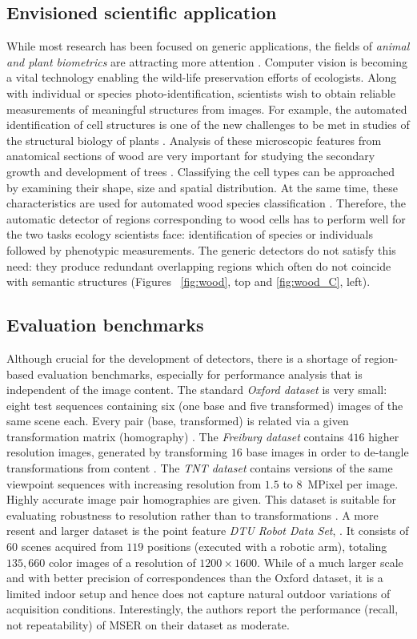 \documentclass[conference,compsoc]{IEEEtran}
\begin{document}
\subsection{Envisioned scientific application}
While most research has been focused on generic applications, the
 fields of {\em animal and plant biometrics} are attracting more attention \cite{Kuehl2013, leafsnap_eccv2012}. Computer vision is becoming a vital technology enabling the wild-life preservation efforts of ecologists. Along with individual or species photo-identification, scientists wish to obtain reliable measurements of meaningful structures from images. For example, the automated identification of cell structures is one of the new challenges to be met in studies of the structural biology of plants \cite{Quelhas2011}. Analysis of these microscopic features from anatomical sections of wood are very important for studying the secondary growth and development of trees \cite{Brunel2014}. Classifying the cell types can be approached by examining their shape, size and spatial distribution. At the same time, these characteristics are used for automated wood species classification \cite{Gasson2011}. Therefore, the  automatic detector of regions corresponding to wood cells has to perform well for the two tasks ecology scientists face: identification of species or individuals followed by phenotypic measurements. The generic detectors do not satisfy this need: they produce redundant overlapping regions which often do not coincide with semantic structures (Figures ~\ref{fig:wood}, top and \ref{fig:wood_C}, left).

\subsection{Evaluation benchmarks}
Although crucial for the development of detectors, there is a shortage of region-based evaluation benchmarks, especially for performance analysis that is independent of the image content.  The standard {\em Oxford dataset} is very small: eight test sequences containing six (one base and five transformed) images of the same scene each. Every pair (base, transformed) is related via a given transformation matrix (homography) \cite{Mikolajczyk:2005}.  The {\em Freiburg dataset} contains $416$ higher resolution images, generated by transforming $16$ base images in order to de-tangle transformations from content \cite{FischerDB14}.  
The {\em TNT dataset} contains versions of the same viewpoint sequences with increasing resolution from $1.5$ to $8$~MPixel per image. Highly accurate image pair homographies are given. This dataset is suitable for evaluating robustness to resolution rather than to transformations \cite{CorRos2013}.  A more resent and larger dataset is the point feature {\em DTU Robot Data Set}, \cite{AanaesDP12}. It  consists of $60$ scenes acquired from $119$ positions (executed with a robotic arm), totaling $135, 660$ color images of a resolution of $1200 \times 1600$. While of a much larger scale and with better precision of correspondences than the Oxford dataset, it is a limited indoor setup and hence does not capture natural outdoor variations of acquisition conditions. Interestingly, the authors report the performance (recall, not repeatability) of MSER on their dataset as moderate. 
\end{document}
